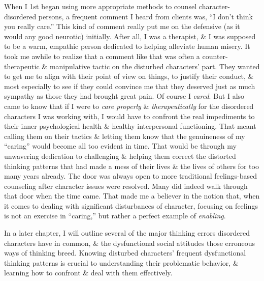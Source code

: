 \documentclass{article}
\numberwithin{equation}{section}
\begin{document}
When I 1st began using more appropriate methods to counsel character-disordered persons, a frequent comment I heard from clients was, ``I don't think you really care.'' This kind of comment really put me on the defensive (as it would any good neurotic) initially. After all, I was a therapist, \& I was supposed to be a warm, empathic person dedicated to helping alleviate human misery. It took me awhile to realize that a comment like that was often a counter-therapeutic \& manipulative tactic on the disturbed characters' part. They wanted to get me to align with their point of view on things, to justify their conduct, \& most especially to see if they could convince me that they deserved just as much sympathy as those they had brought great pain. Of course I \textit{cared}. But I also came to know that if I were to \textit{care properly} \& \textit{therapeutically} for the disordered characters I was working with, I would have to confront the real impediments to their inner psychological health \& healthy interpersonal functioning. That meant calling them on their tactics \& letting them know that the genuineness of my ``caring'' would become all too evident in time. That would be through my unwavering dedication to challenging \& helping them correct the distorted thinking patterns that had made a mess of their lives \& the lives of others for too many years already. The door was always open to more traditional feelings-based counseling after character issues were resolved. Many did indeed walk through that door when the time came. That made me a believer in the notion that, when it comes to dealing with significant disturbances of character, focusing on feelings is not an exercise in ``caring,'' but rather a perfect example of \textit{enabling}.

In a later chapter, I will outline several of the major thinking errors disordered characters have in common, \& the dysfunctional social attitudes those erroneous ways of thinking breed. Knowing disturbed characters' frequent dysfunctional thinking patterns is crucial to understanding their problematic behavior, \& learning how to confront \& deal with them effectively.
\end{document}
